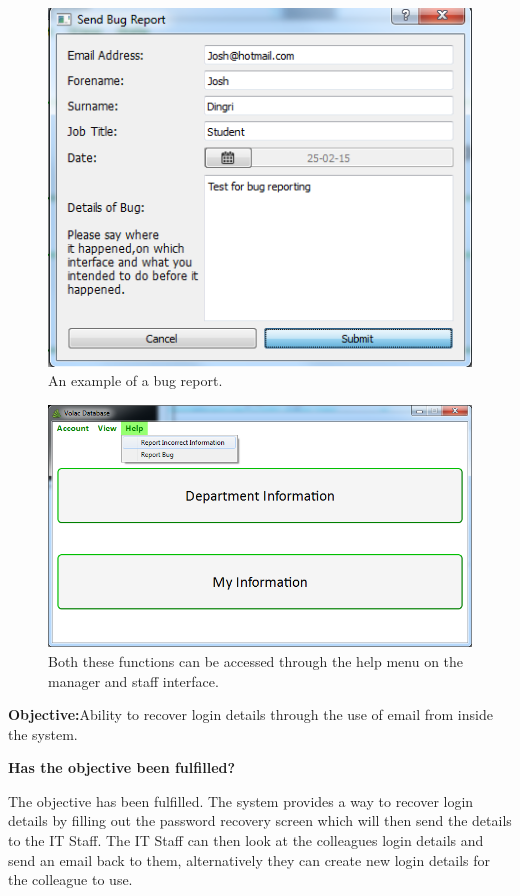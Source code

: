 \begin{figure}[H]
    \includegraphics[width=\textwidth]{./Testing/Images/SubmitBugTest.png}
    \caption{An example of a bug report.} 
\end{figure}

\begin{figure}[H]
    \includegraphics[width=\textwidth]{./Testing/Images/HelpMenu.png}
    \caption{Both these functions can be accessed through the help menu on the manager and staff interface.} 
\end{figure}

\textbf{Objective:}Ability to recover login details through the use of email from inside the system.

\textbf{Has the objective been fulfilled?}

The objective has been fulfilled. The system provides a way to recover login details by filling out the password recovery screen which will then send the details to the IT Staff. The IT Staff can then look at the colleagues login details and send an email back to them, alternatively they can create new login details for the colleague to use.

